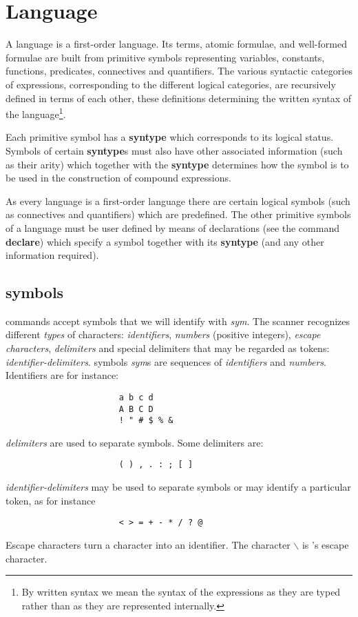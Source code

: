 \section{Language}
\label{sec-lang}
\label{sec-decl}


A {\GF} language is a first-order language.
Its terms, atomic formulae, and
well-formed formulae are built from primitive symbols representing
variables, constants, functions, predicates,
connectives and quantifiers. The various syntactic categories of expressions,
corresponding to the different logical categories, are
recursively defined in terms of each other,
these definitions determining the written syntax of the
language\footnote{By written syntax we mean the syntax of the
expressions as they are typed rather than as they are represented
internally.}.

Each primitive symbol has a {\bf syntype}
which corresponds to its
logical status. Symbols of certain {\bf syntype}s
must also have other associated
information (such as their arity) which together with the {\bf syntype}
determines
how the symbol is to be used in the construction of compound expressions.

As every {\GF} language is a first-order language there are certain
logical symbols (such as connectives and quantifiers)
which are predefined. The other primitive
symbols of a language must be user defined by means of declarations 
(see the command {\bf declare}) which
specify a symbol together with its {\bf syntype}
(and any other information
required).

\subsection{{\GF} symbols}

{\GF} commands accept symbols that we will identify with
{\em sym}. The {\GF} scanner recognizes different {\em types} of
characters: {\em identifiers}, {\em numbers} (positive integers),
{\em escape characters},
{\em delimiters} and special delimiters that 
may be regarded as tokens: {\em identifier-delimiters}.
{\GF} symbols {\em sym}s are sequences of {\em identifiers}
and {\em numbers}. Identifiers are for instance:
\begin{verbatim}
                       a b c d
                       A B C D
                       ! " # $ % &
\end{verbatim}    %
{\em delimiters} are used to separate symbols.
Some delimiters are:
\begin{verbatim}
                       ( ) , . : ; [ ] 
\end{verbatim}
{\em identifier-delimiters} may be used to separate
symbols or may identify a particular token, as for instance
\begin{verbatim}
                       < > = + - * / ? @ 
\end{verbatim}
Escape characters turn a character into an identifier.
The character $\backslash$ is {\GF}'s escape character.

